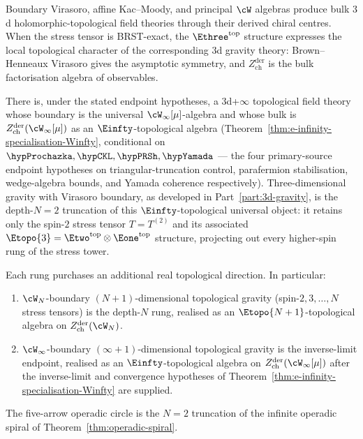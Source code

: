 Boundary Virasoro, affine Kac--Moody, and principal $\cW$ algebras
produce bulk $3$d holomorphic-topological field theories through their
derived chiral centres. When the stress tensor is BRST-exact, the
$\Ethree^{\mathrm{top}}$ structure expresses the local topological
character of the corresponding $3$d gravity theory: Brown--Henneaux
Virasoro gives the asymptotic symmetry, and
$Z^{\mathrm{der}}_{\mathrm{ch}}$ is the bulk factorisation algebra of
observables.

\begin{theorem}
\label{thm:climax-restatement-3d-infty}
There is, under the stated endpoint hypotheses, a
$3$d+$\infty$ topological field theory whose boundary is the universal
$\cW_\infty[\mu]$-algebra and whose bulk is
$Z^{\mathrm{der}}_{\mathrm{ch}}(\cW_\infty[\mu])$ as an
$\Einfty$-topological algebra
\textup{(}Theorem~\ref{thm:e-infinity-specialisation-Winfty},
conditional on $\hypProchazka, \hypCKL, \hypPRSh, \hypYamada$ — the
four primary-source endpoint hypotheses on triangular-truncation
control, parafermion stabilisation, wedge-algebra bounds, and Yamada
coherence respectively\textup{)}.
Three-dimensional gravity with Virasoro boundary, as developed in
Part~\ref{part:3d-gravity}, is the depth-$N = 2$ truncation of this
$\Einfty$-topological universal object: it retains only the spin-$2$
stress tensor $T = T^{(2)}$ and its associated
$\Etopo{3} = \Etwo^{\mathrm{top}} \otimes \Eone^{\mathrm{top}}$
structure, projecting out every higher-spin rung of the stress tower.

Each rung purchases an additional real topological direction. In
particular:
\begin{enumerate}[label=\textup{(\roman*)}]
\item $\cW_N$-boundary $(N+1)$-dimensional topological gravity
 \textup{(}spin-$2, 3, \ldots, N$ stress tensors\textup{)}
 is the depth-$N$ rung, realised as an $\Etopo{N+1}$-topological
 algebra on $Z^{\mathrm{der}}_{\mathrm{ch}}(\cW_N)$.
\item $\cW_\infty$-boundary $(\infty+1)$-dimensional topological
 gravity is the inverse-limit endpoint, realised as an
 $\Einfty$-topological algebra on
 $Z^{\mathrm{der}}_{\mathrm{ch}}(\cW_\infty[\mu])$ after the
 inverse-limit and convergence hypotheses of
 Theorem~\ref{thm:e-infinity-specialisation-Winfty} are supplied.
\end{enumerate}
The five-arrow operadic circle is the $N = 2$ truncation of
the infinite operadic spiral of Theorem~\ref{thm:operadic-spiral}.
\end{theorem}

